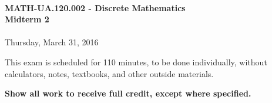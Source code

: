 \documentclass[12pt]{article}
\begin{document}
\thispagestyle{firststyle}
~
\vspace{0.5cm}

\begin{center}
\textbf{\Large MATH-UA.120.002 - Discrete Mathematics \\ \vspace{0.5cm} Midterm 2}\\~\\
Thursday, March 31, 2016
\end{center}

\vspace{1cm}


\vspace{1cm}

\noindent
This exam is scheduled for 110 minutes, to be done individually, without calculators, notes, textbooks, and other outside materials.
\vspace{0.5cm}

\noindent
\textbf{Show all work to receive full credit, except where specified.}

\vspace{1cm}
\end{document}
